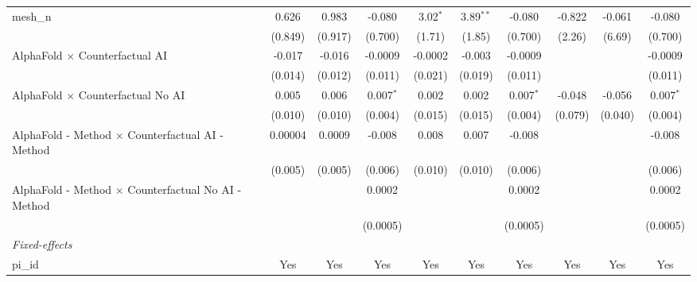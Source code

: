 \begin{tabular}{lccccccccc}
   mesh\_n                                                     & 0.626          & 0.983          & -0.080        & 3.02$^{*}$    & 3.89$^{**}$   & -0.080        & -0.822        & -0.061  & -0.080\\   
                                                               & (0.849)        & (0.917)        & (0.700)       & (1.71)        & (1.85)        & (0.700)       & (2.26)        & (6.69)  & (0.700)\\   
   AlphaFold $\times$ Counterfactual AI                        & -0.017         & -0.016         & -0.0009       & -0.0002       & -0.003        & -0.0009       &               &         & -0.0009\\   
                                                               & (0.014)        & (0.012)        & (0.011)       & (0.021)       & (0.019)       & (0.011)       &               &         & (0.011)\\   
   AlphaFold $\times$ Counterfactual No AI                     & 0.005          & 0.006          & 0.007$^{*}$   & 0.002         & 0.002         & 0.007$^{*}$   & -0.048        & -0.056  & 0.007$^{*}$\\   
                                                               & (0.010)        & (0.010)        & (0.004)       & (0.015)       & (0.015)       & (0.004)       & (0.079)       & (0.040) & (0.004)\\   
   AlphaFold - Method $\times$ Counterfactual AI - Method      & 0.00004        & 0.0009         & -0.008        & 0.008         & 0.007         & -0.008        &               &         & -0.008\\   
                                                               & (0.005)        & (0.005)        & (0.006)       & (0.010)       & (0.010)       & (0.006)       &               &         & (0.006)\\   
   AlphaFold - Method $\times$ Counterfactual No AI - Method   &                &                & 0.0002        &               &               & 0.0002        &               &         & 0.0002\\   
                                                               &                &                & (0.0005)      &               &               & (0.0005)      &               &         & (0.0005)\\   
   \midrule
   \emph{Fixed-effects}\\
   pi\_id                                                      & Yes            & Yes            & Yes           & Yes           & Yes           & Yes           & Yes           & Yes     & Yes\\  

\end{tabular}
